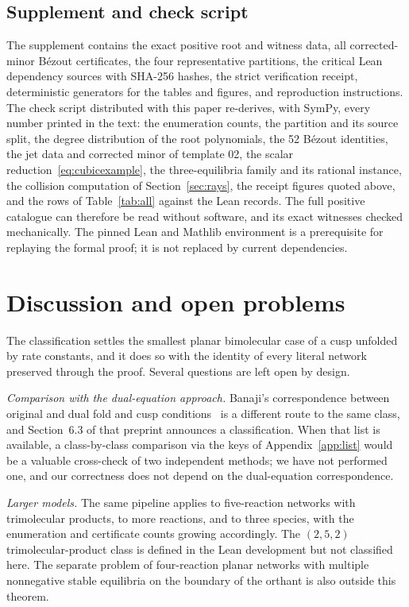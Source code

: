 \documentclass[11pt,a4paper]{article}
\theoremstyle{plain}
\theoremstyle{definition}
\theoremstyle{remark}
\numberwithin{equation}{section}
\begin{document}
\subsection{Supplement and check script}
The supplement contains the exact positive root and witness data, all corrected-minor B\'ezout certificates, the four representative partitions, the critical Lean dependency sources with SHA-256 hashes, the strict verification receipt, deterministic generators for the tables and figures, and reproduction instructions. The check script distributed with this paper re-derives, with SymPy, every number printed in the text: the enumeration counts, the partition and its source split, the degree distribution of the root polynomials, the 52 B\'ezout identities, the jet data and corrected minor of template 02, the scalar reduction~\eqref{eq:cubicexample}, the three-equilibria family and its rational instance, the collision computation of Section~\ref{sec:rays}, the receipt figures quoted above, and the rows of Table~\ref{tab:all} against the Lean records. The full positive catalogue can therefore be read without software, and its exact witnesses checked mechanically. The pinned Lean and Mathlib environment is a prerequisite for replaying the formal proof; it is not replaced by current dependencies.

\section{Discussion and open problems}\label{sec:discussion}

The classification settles the smallest planar bimolecular case of a cusp unfolded by rate constants, and it does so with the identity of every literal network preserved through the proof. Several questions are left open by design.

\emph{Comparison with the dual-equation approach.} Banaji's correspondence between original and dual fold and cusp conditions~\citep{B2026} is a different route to the same class, and Section~6.3 of that preprint announces a classification. When that list is available, a class-by-class comparison via the keys of Appendix~\ref{app:list} would be a valuable cross-check of two independent methods; we have not performed one, and our correctness does not depend on the dual-equation correspondence.

\emph{Larger models.} The same pipeline applies to five-reaction networks with trimolecular products, to more reactions, and to three species, with the enumeration and certificate counts growing accordingly. The $(2,5,2)$ trimolecular-product class is defined in the Lean development but not classified here. The separate problem of four-reaction planar networks with multiple nonnegative stable equilibria on the boundary of the orthant is also outside this theorem.
\end{document}
